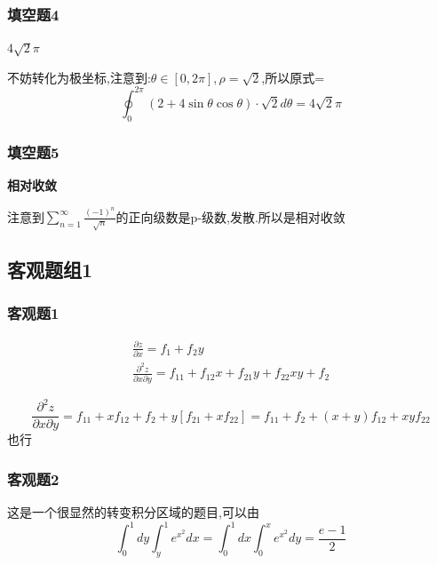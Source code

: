 \documentclass[a4paper,12pt]{ctexrep}
\begin{document}
\subsubsection{填空题4}
\textbf{$4 \sqrt{2} \pi $}

不妨转化为极坐标,注意到:$\theta\in[0,2\pi],\rho=\sqrt{2}$,所以原式=\begin{equation*}
	\oint_{0}^{2\pi}\left(2+4\sin\theta\cos\theta\right)\cdot\sqrt{2}d\theta = 4 \sqrt{2} \pi
\end{equation*}

\subsubsection{填空题5}
\textbf{相对收敛}

注意到$\sum_{n=1}^{\infty}{\frac{(-1)^{n}}{\sqrt{n}}}$的正向级数是p-级数,发散.所以是相对收敛

\newpage

\subsection{客观题组1}
\subsubsection{客观题1}
\begin{eqnarray*}
	\frac{\partial z}{\partial x}=f_{1}+f_{2}y \\
	\frac{\partial ^{2} z}{\partial x\partial y}=f_{11}+f_{12}x+f_{21}y+f_{22}xy+f_{2}
\end{eqnarray*}

$$\frac{\partial^2z}{\partial x\partial y}=f_{11}+xf_{12}+f_{2}+y[f_{21}+xf_{22}]=f_{11}+f_{2}+(x+y)f_{12}+xyf_{22}$$也行

\subsubsection{客观题2}
这是一个很显然的转变积分区域的题目,可以由\begin{equation*}
	\int_{0}^{1}dy\int_{y}^{1}e^{x^{2}}dx
	=\int_{0}^{1}dx\int_{0}^{x}e^{x^{2}}dy
	=\frac{e - 1}{2}
\end{equation*}
\end{document}
